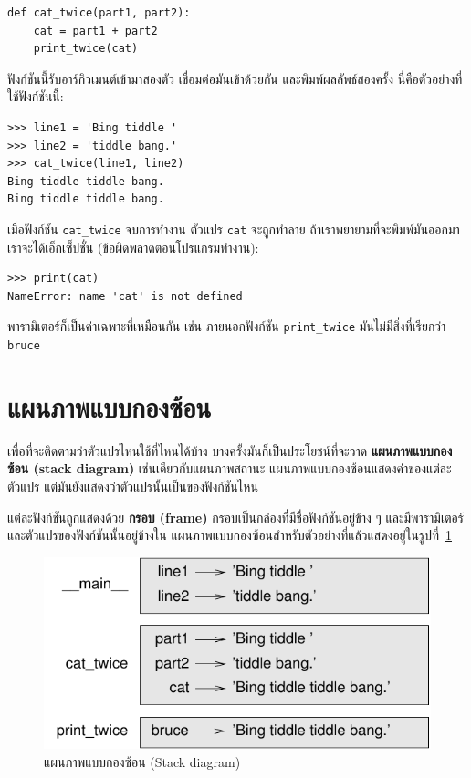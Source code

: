 \begin{verbatim}
def cat_twice(part1, part2):
    cat = part1 + part2
    print_twice(cat)
\end{verbatim}
%
ฟังก์ชันนี้รับอาร์กิวเมนต์เข้ามาสองตัว เชื่อมต่อมันเข้าด้วยกัน และพิมพ์ผลลัพธ์สองครั้ง
นี่คือตัวอย่างที่ใช้ฟังก์ชันนี้:

\begin{verbatim}
>>> line1 = 'Bing tiddle '
>>> line2 = 'tiddle bang.'
>>> cat_twice(line1, line2)
Bing tiddle tiddle bang.
Bing tiddle tiddle bang.
\end{verbatim}
%
เมื่อฟังก์ชัน \verb|cat_twice| จบการทำงาน ตัวแปร {\tt cat} จะถูกทำลาย
ถ้าเราพยายามที่จะพิมพ์มันออกมา เราจะได้เอ็กเซ็ปชั่น (ข้อผิดพลาดตอนโปรแกรมทำงาน):


\begin{verbatim}
>>> print(cat)
NameError: name 'cat' is not defined
\end{verbatim}
%
พารามิเตอร์ก็เป็นค่าเฉพาะที่เหมือนกัน เช่น ภายนอกฟังก์ชัน \verb|print_twice|
มันไม่มีสิ่งที่เรียกว่า {\tt bruce}


\section{แผนภาพแบบกองซ้อน} %
\label{stackdiagram}

เพื่อที่จะติดตามว่าตัวแปรไหนใช้ที่ไหนได้บ้าง บางครั้งมันก็เป็นประโยชน์ที่จะวาด {\bf แผนภาพแบบกองซ้อน (stack diagram)}
เช่นเดียวกับแผนภาพสถานะ แผนภาพแบบกองซ้อนแสดงค่าของแต่ละตัวแปร แต่มันยังแสดงว่าตัวแปรนั้นเป็นของฟังก์ชันไหน 

แต่ละฟังก์ชันถูกแสดงด้วย {\bf กรอบ (frame)} กรอบเป็นกล่องที่มีชื่อฟังก์ชันอยู่ข้าง ๆ และมีพารามิเตอร์และตัวแปรของฟังก์ชันนั้นอยู่ข้างใน แผนภาพแบบกองซ้อนสำหรับตัวอย่างที่แล้วแสดงอยู่ในรูปที่~\ref{fig.stack} 

\begin{figure}
\centerline
{\includegraphics[scale=0.8]{figs/stack.pdf}}
\caption{แผนภาพแบบกองซ้อน (Stack diagram)}
\label{fig.stack}
\end{figure}


